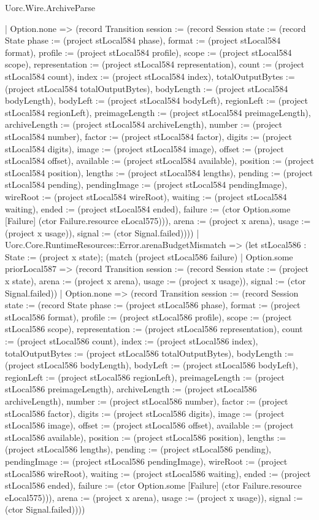 \begin{lexlean}{Uorc.Wire.ArchiveParse}
\begin{semanticmodule}
{        | Option.none => (record Transition {session := (record Session {state := (record State {phase := (project stLocal584 phase), format := (project stLocal584 format), profile := (project stLocal584 profile), scope := (project stLocal584 scope), representation := (project stLocal584 representation), count := (project stLocal584 count), index := (project stLocal584 index), totalOutputBytes := (project stLocal584 totalOutputBytes), bodyLength := (project stLocal584 bodyLength), bodyLeft := (project stLocal584 bodyLeft), regionLeft := (project stLocal584 regionLeft), preimageLength := (project stLocal584 preimageLength), archiveLength := (project stLocal584 archiveLength), number := (project stLocal584 number), factor := (project stLocal584 factor), digits := (project stLocal584 digits), image := (project stLocal584 image), offset := (project stLocal584 offset), available := (project stLocal584 available), position := (project stLocal584 position), lengths := (project stLocal584 lengths), pending := (project stLocal584 pending), pendingImage := (project stLocal584 pendingImage), wireRoot := (project stLocal584 wireRoot), waiting := (project stLocal584 waiting), ended := (project stLocal584 ended), failure := (ctor Option.some [Failure] (ctor Failure.resource eLocal575))}), arena := (project x arena), usage := (project x usage)}), signal := (ctor Signal.failed)})))
      | Uorc.Core.RuntimeResources::Error.arenaBudgetMismatch => (let stLocal586 : State := (project x state); (match (project stLocal586 failure)
        | Option.some priorLocal587 => (record Transition {session := (record Session {state := (project x state), arena := (project x arena), usage := (project x usage)}), signal := (ctor Signal.failed)})
        | Option.none => (record Transition {session := (record Session {state := (record State {phase := (project stLocal586 phase), format := (project stLocal586 format), profile := (project stLocal586 profile), scope := (project stLocal586 scope), representation := (project stLocal586 representation), count := (project stLocal586 count), index := (project stLocal586 index), totalOutputBytes := (project stLocal586 totalOutputBytes), bodyLength := (project stLocal586 bodyLength), bodyLeft := (project stLocal586 bodyLeft), regionLeft := (project stLocal586 regionLeft), preimageLength := (project stLocal586 preimageLength), archiveLength := (project stLocal586 archiveLength), number := (project stLocal586 number), factor := (project stLocal586 factor), digits := (project stLocal586 digits), image := (project stLocal586 image), offset := (project stLocal586 offset), available := (project stLocal586 available), position := (project stLocal586 position), lengths := (project stLocal586 lengths), pending := (project stLocal586 pending), pendingImage := (project stLocal586 pendingImage), wireRoot := (project stLocal586 wireRoot), waiting := (project stLocal586 waiting), ended := (project stLocal586 ended), failure := (ctor Option.some [Failure] (ctor Failure.resource eLocal575))}), arena := (project x arena), usage := (project x usage)}), signal := (ctor Signal.failed)})))
}
\end{semanticmodule}
\end{lexlean}
